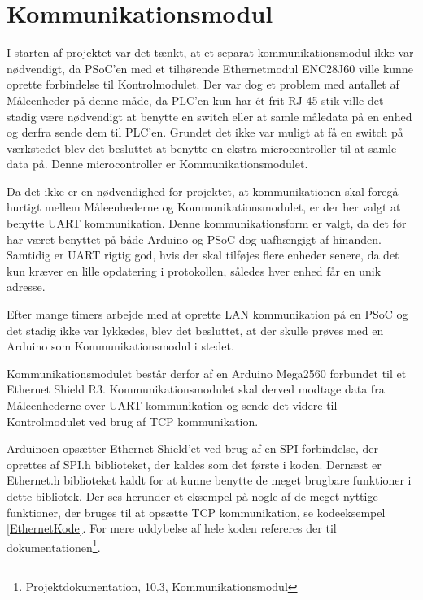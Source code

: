 
\section{Kommunikationsmodul}
\label{Kommunikationsmodul}

I starten af projektet var det tænkt, at et separat kommunikationsmodul ikke var nødvendigt, da PSoC'en med et tilhørende Ethernetmodul ENC28J60 ville kunne oprette forbindelse til Kontrolmodulet. Der var dog et problem med antallet af Måleenheder på denne måde, da PLC'en kun har ét frit RJ-45 stik ville det stadig være nødvendigt at benytte en switch eller at samle måledata på en enhed og derfra sende dem til PLC'en. Grundet det ikke var muligt at få en switch på værkstedet blev det besluttet at benytte en ekstra microcontroller til at samle data på. Denne microcontroller er Kommunikationsmodulet.   

Da det ikke er en nødvendighed for projektet, at kommunikationen skal foregå hurtigt mellem Måleenhederne og Kommunikationsmodulet, er der her valgt at benytte UART kommunikation. Denne kommunikationsform er valgt, da det før har været benyttet på både Arduino og PSoC dog uafhængigt af hinanden. Samtidig er UART rigtig god, hvis der skal tilføjes flere enheder senere, da det kun kræver en lille opdatering i protokollen, således hver enhed får en unik adresse.  

Efter mange timers arbejde med at oprette LAN kommunikation på en PSoC og det stadig ikke var lykkedes, blev det besluttet, at der skulle prøves med en Arduino som Kommunikationsmodul i stedet. 

Kommunikationsmodulet består derfor af en Arduino Mega2560 forbundet til et Ethernet Shield R3. Kommunikationsmodulet skal derved modtage data fra Måleenhederne over UART kommunikation og sende det videre til Kontrolmodulet ved brug af TCP kommunikation. 

Arduinoen opsætter Ethernet Shield'et ved brug af en SPI forbindelse, der oprettes af SPI.h biblioteket, der kaldes som det første i koden. Dernæst er Ethernet.h biblioteket kaldt for at kunne benytte de meget brugbare funktioner i dette bibliotek\cite{Ethernet}. Der ses herunder et eksempel på nogle af de meget nyttige funktioner, der bruges til at opsætte TCP kommunikation, se kodeeksempel \ref{EthernetKode}. For mere uddybelse af hele koden refereres der til dokumentationen\footnote{Projektdokumentation, 10.3, Kommunikationsmodul}.

